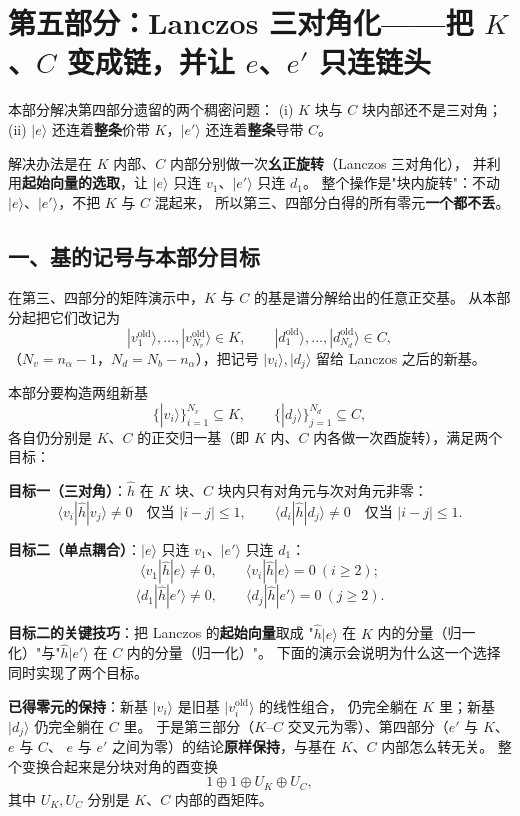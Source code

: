 \documentclass[11pt]{ctexart}
\begin{document}
\medskip
\section*{第五部分：Lanczos 三对角化——把 $K$、$C$ 变成链，并让 $e$、$e'$ 只连链头}

\noindent 本部分解决第四部分遗留的两个稠密问题：
(i) $K$ 块与 $C$ 块内部还不是三对角；
(ii) $|e\rangle$ 还连着\textbf{整条}价带 $K$，$|e'\rangle$ 还连着\textbf{整条}导带 $C$。

解决办法是在 $K$ 内部、$C$ 内部分别做一次\textbf{幺正旋转}（Lanczos 三对角化），
并利用\textbf{起始向量的选取}，让 $|e\rangle$ 只连 $v_1$、$|e'\rangle$ 只连 $d_1$。
整个操作是"块内旋转"：不动 $|e\rangle$、$|e'\rangle$，不把 $K$ 与 $C$ 混起来，
所以第三、四部分白得的所有零元\textbf{一个都不丢}。

\subsection{一、基的记号与本部分目标}

在第三、四部分的矩阵演示中，$K$ 与 $C$ 的基是谱分解给出的任意正交基。
从本部分起把它们改记为
\[
|v_1^{\mathrm{old}}\rangle,\dots,|v_{N_v}^{\mathrm{old}}\rangle\in K,
\qquad
|d_1^{\mathrm{old}}\rangle,\dots,|d_{N_d}^{\mathrm{old}}\rangle\in C,
\]
（$N_v=n_\alpha-1$，$N_d=N_b-n_\alpha$），把记号 $|v_i\rangle,|d_j\rangle$
留给 Lanczos 之后的新基。

本部分要构造两组新基
\[
\{|v_i\rangle\}_{i=1}^{N_v}\subseteq K,\qquad
\{|d_j\rangle\}_{j=1}^{N_d}\subseteq C ,
\]
各自仍分别是 $K$、$C$ 的正交归一基（即 $K$ 内、$C$ 内各做一次酉旋转），满足两个目标：

\textbf{目标一（三对角）}：$\hat h$ 在 $K$ 块、$C$ 块内只有对角元与次对角元非零：
\[
\langle v_i|\hat h|v_j\rangle\neq0\quad\text{仅当 } |i-j|\le1,
\qquad
\langle d_i|\hat h|d_j\rangle\neq0\quad\text{仅当 } |i-j|\le1 .
\]

\textbf{目标二（单点耦合）}：$|e\rangle$ 只连 $v_1$、$|e'\rangle$ 只连 $d_1$：
\[
\langle v_1|\hat h|e\rangle\neq0,\qquad \langle v_i|\hat h|e\rangle=0\ (i\ge2);
\]
\[
\langle d_1|\hat h|e'\rangle\neq0,\qquad \langle d_j|\hat h|e'\rangle=0\ (j\ge2).
\]

\textbf{目标二的关键技巧}：把 Lanczos 的\textbf{起始向量}取成
"$\hat h|e\rangle$ 在 $K$ 内的分量（归一化）"与"$\hat h|e'\rangle$ 在 $C$ 内的分量（归一化）"。
下面的演示会说明为什么这一个选择同时实现了两个目标。

\textbf{已得零元的保持}：新基 $|v_i\rangle$ 是旧基 $|v_i^{\mathrm{old}}\rangle$ 的线性组合，
仍完全躺在 $K$ 里；新基 $|d_j\rangle$ 仍完全躺在 $C$ 里。
于是第三部分（$K$--$C$ 交叉元为零）、第四部分（$e'$ 与 $K$、$e$ 与 $C$、
$e$ 与 $e'$ 之间为零）的结论\textbf{原样保持}，与基在 $K$、$C$ 内部怎么转无关。
整个变换合起来是分块对角的酉变换
\[
1\oplus 1\oplus U_K\oplus U_C ,
\]
其中 $U_K,U_C$ 分别是 $K$、$C$ 内部的酉矩阵。
\end{document}
